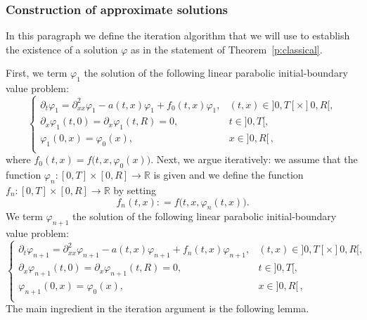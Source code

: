 \documentclass[11pt,leqno]{amsart}
\numberwithin{equation}{section}
\begin{document}
\subsubsection{Construction of approximate solutions}
\label{ss:exa}
In this paragraph we define the iteration algorithm that we will use to establish the existence of a solution $\varphi$ as in the statement of Theorem~\ref{p:classical}. 

First, we term $\varphi_1$ the 
solution of the following linear parabolic initial-boundary value problem:   
\begin{equation}
\label{eq:auxiliary-system1}
\begin{cases}
{\partial_t} {\varphi}_{1} = {\partial_{xx}^2} {\varphi}_{1} - a(t, x) {\varphi}_{1} + f_0 (t, x) {\varphi}_{1}, & (t, x) \in ]0, T[ \times ]0, R[ ,  \\
{\partial_x } {\varphi}_{1}(t,0)={\partial_x } {\varphi}_{1} (t,R) = 0, & t \in ]0, T[, \\
{\varphi}_{1} (0,x) = {\varphi}_0(x), & x \in ]0,R[ \, ,\\
\end{cases}
\end{equation}
where $f_0(t, x) = f \big(t, x, \varphi_0( x) \big).$
Next, we argue iteratively: we assume that the function ${\varphi_n \! : \! [0, T] \! \times \! [0, R] \!\to \! {\mathbb{R}}}$ is given and we define the function $f_n: [0, T] \times [0, R] \to {\mathbb{R}}$ by setting 
\begin{equation}
\label{e:effenne}
    f_n (t, x) : = f \big( t, x, \varphi_n (t, x) \big). 
\end{equation}
We term $\varphi_{n+1}$ the solution of the following linear parabolic initial-boundary value problem:   
\begin{equation}
  \label{e:sy:itera}
  \begin{cases}
    {\partial_t} {\varphi}_{n+1} = {\partial_{xx}^2} {\varphi}_{n+1} - a (t, x)
    {\varphi}_{n+1} + f_n (t,x) {\varphi}_{n+1}, & (t, x) \in ]0, T[ \times ]0, R[ ,  \\
    {\partial_x } {\varphi}_{n+1}(t,0)={\partial_x } {\varphi}_{n+1} (t,R) = 0, & t \in ]0, T[, \\
    {\varphi}_{n+1} (0,x) = {\varphi}_0(x), & x \in ]0,R[ \, ,\\
  \end{cases}
\end{equation}
The main ingredient in the iteration argument is the following lemma.  
\end{document}
